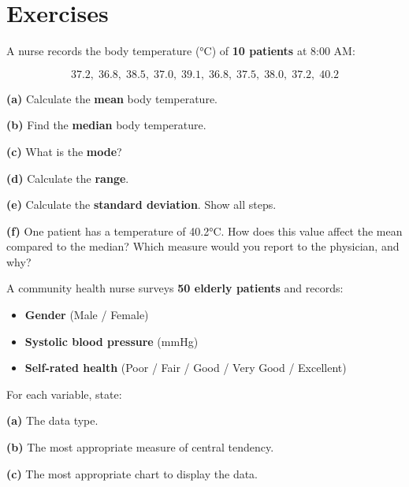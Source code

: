 \documentclass[
  12pt,
  letterpaper,
]{book}
\providecommand{\tightlist}{%
  \setlength{\itemsep}{0pt}\setlength{\parskip}{0pt}}
\begin{document}
\chapter{Exercises}\label{exercises-1}

\begin{tcolorbox}[enhanced jigsaw, arc=.35mm, bottomrule=.15mm, bottomtitle=1mm, breakable, colback=white, colbacktitle=quarto-callout-caution-color!10!white, colframe=quarto-callout-caution-color-frame, coltitle=black, left=2mm, leftrule=.75mm, opacityback=0, opacitybacktitle=0.6, rightrule=.15mm, title={✏️ Exercise 1}, titlerule=0mm, toprule=.15mm, toptitle=1mm]

A nurse records the body temperature (°C) of \textbf{10 patients} at
8:00 AM:

\[37.2, \; 36.8, \; 38.5, \; 37.0, \; 39.1, \; 36.8, \; 37.5, \; 38.0, \; 37.2, \; 40.2\]

\textbf{(a)} Calculate the \textbf{mean} body temperature.

\textbf{(b)} Find the \textbf{median} body temperature.

\textbf{(c)} What is the \textbf{mode}?

\textbf{(d)} Calculate the \textbf{range}.

\textbf{(e)} Calculate the \textbf{standard deviation}. Show all steps.

\textbf{(f)} One patient has a temperature of 40.2°C. How does this
value affect the mean compared to the median? Which measure would you
report to the physician, and why?

\end{tcolorbox}

\begin{tcolorbox}[enhanced jigsaw, arc=.35mm, bottomrule=.15mm, bottomtitle=1mm, breakable, colback=white, colbacktitle=quarto-callout-caution-color!10!white, colframe=quarto-callout-caution-color-frame, coltitle=black, left=2mm, leftrule=.75mm, opacityback=0, opacitybacktitle=0.6, rightrule=.15mm, title={✏️ Exercise 2}, titlerule=0mm, toprule=.15mm, toptitle=1mm]

A community health nurse surveys \textbf{50 elderly patients} and
records:

\begin{itemize}
\tightlist
\item
  \textbf{Gender} (Male / Female)
\item
  \textbf{Systolic blood pressure} (mmHg)
\item
  \textbf{Self-rated health} (Poor / Fair / Good / Very Good /
  Excellent)
\end{itemize}

For each variable, state:

\textbf{(a)} The data type.

\textbf{(b)} The most appropriate measure of central tendency.

\textbf{(c)} The most appropriate chart to display the data.

\end{tcolorbox}
\end{document}
